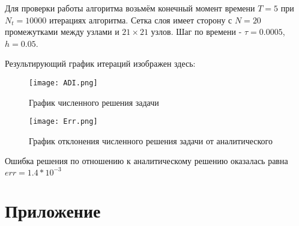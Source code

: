 Для проверки работы алгоритма возьмём конечный момент времени $T=5$ при $N_t=10000$ итерациях алгоритма. 
Сетка слоя имеет сторону с $N=20$ промежутками между узлами и $21 \times 21$ узлов.
Шаг по времени - $\tau = 0.0005$, $h=0.05$.
 
Результирующий график итераций изображен здесь:

\begin{figure}[h]
\centering
\texttt{[image: ADI.png]}
\caption{График численного решения задачи}
\end{figure}

\begin{figure}[h]
\centering
\texttt{[image: Err.png]}
\caption{График отклонения численного решения задачи от аналитического}
\end{figure}

Ошибка решения по отношению к аналитическому решению оказалась равна $err = 1.4 * 10^{-3}$


\newpage

\section{Приложение}

